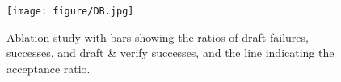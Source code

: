 \begin{figure}[h!]
\centering
\texttt{[image: figure/DB.jpg]}
\vspace{-.8em}
\caption{\small Ablation study with bars showing the ratios of draft failures, successes, and draft \& verify successes, and the line indicating the acceptance ratio.}
\label{fig:ablation}
\end{figure}
